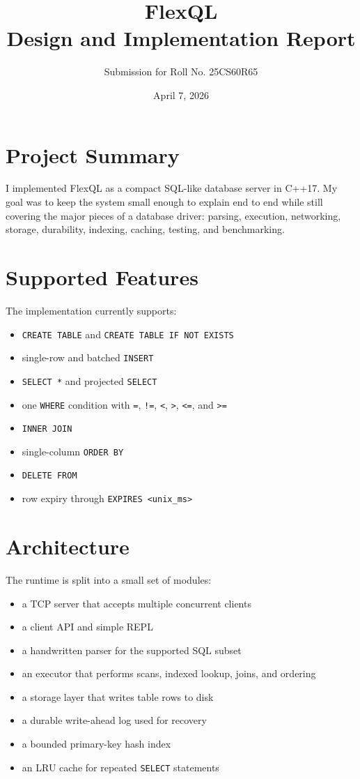 \documentclass[11pt,a4paper]{article}
\title{\textbf{FlexQL}\\Design and Implementation Report}
\author{Submission for Roll No. 25CS60R65}
\date{April 7, 2026}
\begin{document}
\maketitle

\section{Project Summary}

I implemented FlexQL as a compact SQL-like database server in C++17. My goal was to keep the system small enough to explain end to end while still covering the major pieces of a database driver: parsing, execution, networking, storage, durability, indexing, caching, testing, and benchmarking.

\section{Supported Features}

The implementation currently supports:

\begin{itemize}[leftmargin=1.5em]
    \item \texttt{CREATE TABLE} and \texttt{CREATE TABLE IF NOT EXISTS}
    \item single-row and batched \texttt{INSERT}
    \item \texttt{SELECT *} and projected \texttt{SELECT}
    \item one \texttt{WHERE} condition with \texttt{=}, \texttt{!=}, \texttt{<}, \texttt{>}, \texttt{<=}, and \texttt{>=}
    \item \texttt{INNER JOIN}
    \item single-column \texttt{ORDER BY}
    \item \texttt{DELETE FROM}
    \item row expiry through \texttt{EXPIRES <unix\_ms>}
\end{itemize}

\section{Architecture}

The runtime is split into a small set of modules:

\begin{itemize}[leftmargin=1.5em]
    \item a TCP server that accepts multiple concurrent clients
    \item a client API and simple REPL
    \item a handwritten parser for the supported SQL subset
    \item an executor that performs scans, indexed lookup, joins, and ordering
    \item a storage layer that writes table rows to disk
    \item a durable write-ahead log used for recovery
    \item a bounded primary-key hash index
    \item an LRU cache for repeated \texttt{SELECT} statements
\end{itemize}
\end{document}
